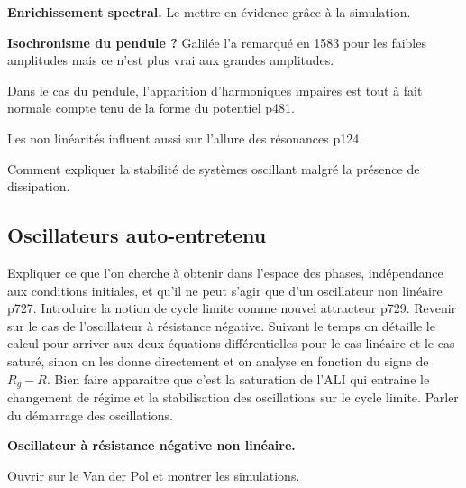 \begin{experience}
\textbf{Enrichissement spectral.}
Le mettre en évidence grâce à la simulation.
\end{experience}

\begin{experience}
\textbf{Isochronisme du pendule ?}
Galilée l'a remarqué en 1583 pour les faibles amplitudes mais ce n'est plus vrai aux grandes amplitudes.
\end{experience}

\begin{remarque}
Dans le cas du pendule, l'apparition d'harmoniques impaires est tout à fait normale compte tenu de la forme du potentiel \cite{Fruchart2016} p481.

\noindent
Les non linéarités influent aussi sur l'allure des résonances \cite{Landau1969} p124.
\end{remarque}

\begin{transition}
Comment expliquer la stabilité de systèmes oscillant malgré la présence de dissipation.
\end{transition}

\subsection{Oscillateurs auto-entretenu}

Expliquer ce que l'on cherche à obtenir dans l'espace des phases, indépendance aux conditions initiales, et qu'il ne peut s'agir que d'un oscillateur non linéaire \cite{Gie1992} p727.
Introduire la notion de cycle limite comme nouvel attracteur \cite{Gie1992} p729.
Revenir sur le cas de l'oscillateur à résistance négative.
Suivant le temps on détaille le calcul pour arriver aux deux équations différentielles pour le cas linéaire et le cas saturé, sinon on les donne directement et on analyse en fonction du signe de $R_g-R$.
Bien faire apparaitre que c'est la saturation de l'ALI qui entraine le changement de régime et la stabilisation des oscillations sur le cycle limite.
Parler du démarrage des oscillations.

\begin{experience}
\textbf{Oscillateur à résistance négative non linéaire.}
\end{experience}

Ouvrir sur le Van der Pol et montrer les simulations.

